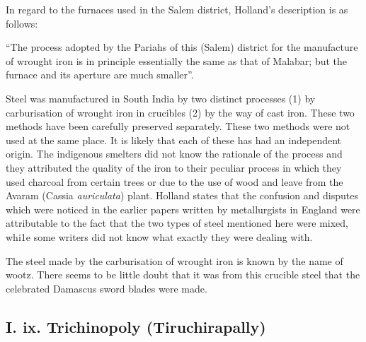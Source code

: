 In regard to the furnaces used in the Salem district, Holland’s description is as follows: 

“The process adopted by the Pariahs of this (Salem) district for the manufacture of wrought iron is in principle essentially the same as that of Malabar; but the furnace and its aperture are much smaller”. 

Steel was manufactured in South India by two distinct processes (1) by carburisation of wrought iron in crucibles (2) by the way of cast iron. These two methods have been carefully preserved separately. These two methods were not used at the same place. It is likely that each of these has had an independent origin. The indigenous smelters did not know the rationale of the process and they attributed the quality of the iron to their peculiar process in which they used charcoal from certain trees or due to the use of wood and leave from the Avaram (Cassia {\it auriculata}) plant. Holland states that the confusion and disputes which were noticed in the earlier papers written by metallurgists in England were attributable to the fact that the two types of steel mentioned here were mixed, whi1e some writers did not know what exactly they were dealing with.

The steel made by the carburisation of wrought iron is known by the name of wootz. There seems to be little doubt that it was from this crucible steel that the celebrated Damascus sword blades were made. 

\subsection*{I. ix. Trichinopoly (Tiruchirapally)}\label{subsection-9}

